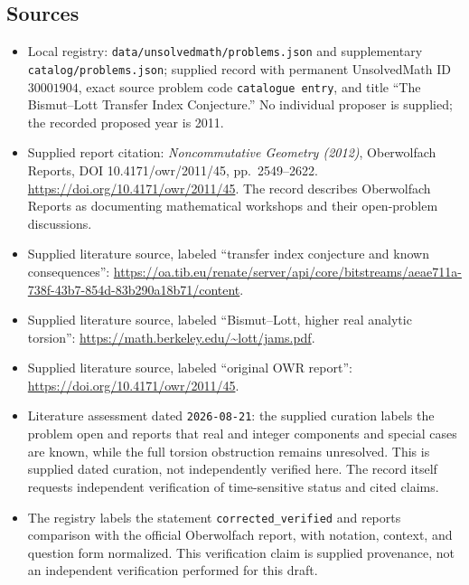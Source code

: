 \documentclass[11pt]{article}
\begin{document}
\subsection{Sources}
\begin{itemize}
\item Local registry: \texttt{data/unsolvedmath/problems.json} and supplementary \texttt{catalog/problems.json}; supplied record with permanent UnsolvedMath ID \(30001904\), exact source problem code \texttt{catalogue entry}, and title ``The Bismut--Lott Transfer Index Conjecture.'' No individual proposer is supplied; the recorded proposed year is 2011.
\item Supplied report citation: \emph{Noncommutative Geometry (2012)}, Oberwolfach Reports, DOI 10.4171/owr/2011/45, pp.~2549--2622. \url{https://doi.org/10.4171/owr/2011/45}. The record describes Oberwolfach Reports as documenting mathematical workshops and their open-problem discussions.
\item Supplied literature source, labeled ``transfer index conjecture and known consequences'': \url{https://oa.tib.eu/renate/server/api/core/bitstreams/aeae711a-738f-43b7-854d-83b290a18b71/content}.
\item Supplied literature source, labeled ``Bismut--Lott, higher real analytic torsion'': \url{https://math.berkeley.edu/~lott/jams.pdf}.
\item Supplied literature source, labeled ``original OWR report'': \url{https://doi.org/10.4171/owr/2011/45}.
\item Literature assessment dated \texttt{2026-08-21}: the supplied curation labels the problem open and reports that real and integer components and special cases are known, while the full torsion obstruction remains unresolved. This is supplied dated curation, not independently verified here. The record itself requests independent verification of time-sensitive status and cited claims.
\item The registry labels the statement \texttt{corrected\_verified} and reports comparison with the official Oberwolfach report, with notation, context, and question form normalized. This verification claim is supplied provenance, not an independent verification performed for this draft.
\end{itemize}
\end{document}

